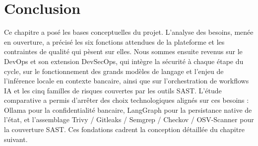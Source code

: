 \section*{Conclusion}

Ce chapitre a posé les bases conceptuelles du projet. L'analyse des besoins, menée en
ouverture, a précisé les six fonctions attendues de la plateforme et les contraintes de
qualité qui pèsent sur elles. Nous sommes ensuite revenus sur le DevOps et son extension
DevSecOps, qui intègre la sécurité à chaque étape du cycle, sur le fonctionnement des
grands modèles de langage et l'enjeu de l'inférence locale en contexte bancaire, ainsi
que sur l'orchestration de workflows IA et les cinq familles de risques couvertes par
les outils SAST. L'étude comparative a permis d'arrêter des choix technologiques alignés
sur ces besoins : Ollama \cite{Ollama} pour la confidentialité bancaire, LangGraph
\cite{LangGraph} pour la persistance native de l'état, et l'assemblage Trivy / Gitleaks /
Semgrep / Checkov / OSV-Scanner pour la couverture SAST. Ces fondations cadrent la
conception détaillée du chapitre suivant.
